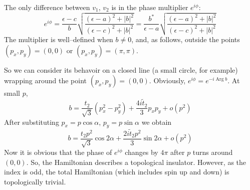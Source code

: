 \documentclass{article}
\DeclareMathOperator{\Arg}{Arg}
\begin{document}
The only difference between $v_1$, $v_2$ is in the phase multiplier $e^{i\phi}$:
\begin{equation}
	e^{i\phi} = \frac{\epsilon - c}{b} \sqrt{\frac{(\epsilon-a)^2+|b|^2}{(\epsilon-c)^2+|b|^2}}=
	\frac{b^*}{\epsilon - a} \sqrt{\frac{(\epsilon-a)^2+|b|^2}{(\epsilon-c)^2+|b|^2}}
\end{equation}
The multiplier is well--defined when $b \ne 0$, and, as follows, outside the points
$(p_x, p_y) = (0,0)$ or $(p_x, p_y) = (\pi, \pi)$. 

So we can consider its behavoir on a closed line (a small circle, for example) wrapping
around the point $(p_x, p_y) = (0,0)$. Obviously, $e^{i\phi} = e^{-i\Arg{b}}$. At small
$p$, 
\begin{equation}
	b = \frac{t_2}{\sqrt{3}}(p_x^2 - p_y^2) + \frac{4i\tilde{t}_2}{3} p_x p_y + o(p^2)
\end{equation}
After substituting $p_x = p \cos{\alpha}$, $p_y = p \sin{\alpha}$ we obtain
\begin{equation}
	b = \frac{t_2p^2}{\sqrt{3}} \cos{2\alpha} + 
			\frac{2i\tilde{t}_2p^2}{3} \sin{2\alpha} + o(p^2)
\end{equation}
Now it is obvious that the phase of $e^{i\phi}$ changes by $4\pi$ after $p$ turns around 
$(0,0)$. So, the Hamiltonian describes a topological insulator. However, as the index is
odd, the total Hamiltonian (which includes spin up and down) is topologically trivial.

\end{document}
